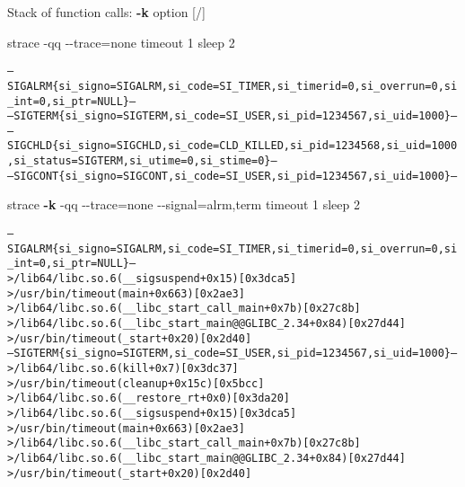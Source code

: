 \documentclass[unicode,aspectratio=169,xcolor={table,dvipsnames,usernames}]{beamer}
\begin{document}
\begin{frame}[fragile]{Stack of function calls: \textbf{-k} option \hfill [\insertframenumber/\inserttotalframenumber]}
\begin{block}{strace -qq -{}-trace=none timeout 1 sleep 2}
\scriptsize
\begin{alltt}
--- SIGALRM \{si_signo=SIGALRM, si_code=SI_TIMER, si_timerid=0, si_overrun=0, si_int=0, si_ptr=NULL\} ---
--- SIGTERM \{si_signo=SIGTERM, si_code=SI_USER, si_pid=1234567, si_uid=1000\} ---
--- SIGCHLD \{si_signo=SIGCHLD, si_code=CLD_KILLED, si_pid=1234568, si_uid=1000, si_status=SIGTERM, si_utime=0, si_stime=0\} ---
--- SIGCONT \{si_signo=SIGCONT, si_code=SI_USER, si_pid=1234567, si_uid=1000\} ---
\end{alltt}
\end{block}
\begin{block}{strace \textbf{-k} -qq -{}-trace=none -{}-signal=alrm,term timeout 1 sleep 2}
\scriptsize
\begin{alltt}
--- SIGALRM \{si_signo=SIGALRM, si_code=SI_TIMER, si_timerid=0, si_overrun=0, si_int=0, si_ptr=NULL\} ---
 > /lib64/libc.so.6(__sigsuspend+0x15) [0x3dca5]
 > /usr/bin/timeout(main+0x663) [0x2ae3]
 > /lib64/libc.so.6(__libc_start_call_main+0x7b) [0x27c8b]
 > /lib64/libc.so.6(__libc_start_main@@GLIBC_2.34+0x84) [0x27d44]
 > /usr/bin/timeout(_start+0x20) [0x2d40]
--- SIGTERM \{si_signo=SIGTERM, si_code=SI_USER, si_pid=1234567, si_uid=1000\} ---
 > /lib64/libc.so.6(kill+0x7) [0x3dc37]
 > /usr/bin/timeout(cleanup+0x15c) [0x5bcc]
 > /lib64/libc.so.6(__restore_rt+0x0) [0x3da20]
 > /lib64/libc.so.6(__sigsuspend+0x15) [0x3dca5]
 > /usr/bin/timeout(main+0x663) [0x2ae3]
 > /lib64/libc.so.6(__libc_start_call_main+0x7b) [0x27c8b]
 > /lib64/libc.so.6(__libc_start_main@@GLIBC_2.34+0x84) [0x27d44]
 > /usr/bin/timeout(_start+0x20) [0x2d40]
\end{alltt}
\end{block}
\end{frame}
\end{document}
